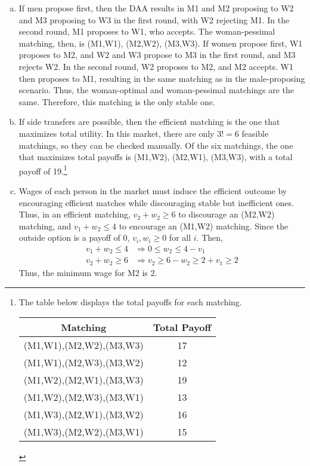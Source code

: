 \documentclass{article}
\begin{document}
\begin{enumerate}[(a)]
	\item If men propose first, then the DAA results in M1 and M2 proposing to W2 and M3 proposing to W3 in the first round, with W2 rejecting M1. In the second round, M1 proposes to W1, who accepts. The woman-pessimal matching, then, is (M1,W1), (M2,W2), (M3,W3). If women propose first, W1 proposes to M2, and W2 and W3 propose to M3 in the first round, and M3 rejects W2. In the second round, W2 proposes to M2, and M2 accepts. W1 then proposes to M1, resulting in the same matching as in the male-proposing scenario. Thus, the woman-optimal and woman-pessimal matchings are the same. Therefore, this matching is the only stable one.
	
	\item If side transfers are possible, then the efficient matching is the one that maximizes total utility. In this market, there are only ${3!=6}$ feasible matchings, so they can be checked manually. Of the six matchings, the one that maximizes total payoffs is (M1,W2), (M2,W1), (M3,W3), with a total payoff of 19.\footnote{The table below displays the total payoffs for each matching.
		\begin{center}
			\begin{tabular}{c|c}
				Matching 				& Total Payoff \\ \hline
				(M1,W1),(M2,W2),(M3,W3)	& 17			\\
				(M1,W1),(M2,W3),(M3,W2)	& 12			\\
				(M1,W2),(M2,W1),(M3,W3)	& 19			\\
				(M1,W2),(M2,W3),(M3,W1)	& 13			\\
				(M1,W3),(M2,W1),(M3,W2)	& 16			\\
				(M1,W3),(M2,W2),(M3,W1)	& 15			
			\end{tabular}
		\end{center}
		}
	
	\item Wages of each person in the market must induce the efficient outcome by encouraging efficient matches while discouraging stable but inefficient ones. Thus, in an efficient matching, ${v_2 + w_2\geq 6}$ to discourage an (M2,W2) matching, and ${v_1 + w_2 \leq 4}$ to encourage an (M1,W2) matching. Since the outside option is a payoff of 0, ${v_i,w_i\geq 0}$ for all $i$. Then,
		\begin{align*}
			v_1 + w_2 	\leq 4	&\Rightarrow 0\leq w_2 \leq 4 - v_1					\\
			v_2 + w_2	\geq 6	&\Rightarrow v_2 \geq 6 - w_2 \geq 2 + v_1 \geq 2	
		\end{align*}
		Thus, the minimum wage for M2 is 2.
\end{enumerate}
\end{document}
